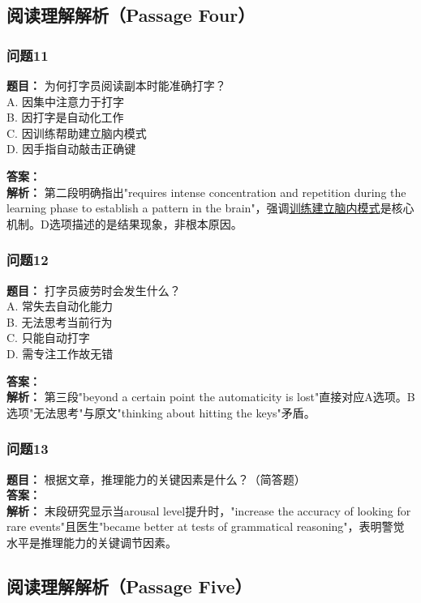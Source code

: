 \documentclass{article}
\begin{document}
%
\subsection*{阅读理解解析（Passage Four）}

\subsubsection*{问题11}
\textbf{题目：} 为何打字员阅读副本时能准确打字？\\
A. 因集中注意力于打字 \\
B. 因打字是自动化工作 \\
C. 因训练帮助建立脑内模式 \\
D. 因手指自动敲击正确键

\textbf{答案：}  \\
\textbf{解析：} 第二段明确指出"requires intense concentration and repetition during the learning phase to establish a pattern in the brain"，强调\underline{训练建立脑内模式}是核心机制。D选项描述的是结果现象，非根本原因。

\subsubsection*{问题12}
\textbf{题目：} 打字员疲劳时会发生什么？\\
A. 常失去自动化能力 \\
B. 无法思考当前行为 \\
C. 只能自动打字 \\
D. 需专注工作故无错

\textbf{答案：}  \\
\textbf{解析：} 第三段"beyond a certain point the automaticity is lost"直接对应A选项。B选项"无法思考"与原文"thinking about hitting the keys"矛盾。

\subsubsection*{问题13}
\textbf{题目：} 根据文章，推理能力的关键因素是什么？（简答题）\\
\textbf{答案：}  \\
\textbf{解析：} 末段研究显示当arousal level提升时，"increase the accuracy of looking for rare events"且医生"became better at tests of grammatical reasoning"，表明警觉水平是推理能力的关键调节因素。

\subsection*{阅读理解解析（Passage Five）}
\end{document}
